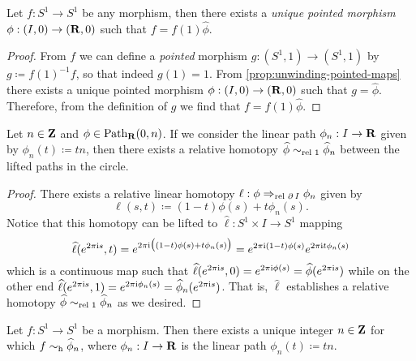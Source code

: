 \begin{theorem}
\label{thm:unwinding-maps}
Let \(f: S^1 \to S^1\) be any morphism, then there exists a \emph{unique pointed
  morphism} \(\phi: (I, 0) \to (\mathbf{R}, 0)\) such that \(f = f(1) \widehat \phi\).
\end{theorem}

\begin{proof}
From \(f\) we can define a \emph{pointed} morphism \(g: (S^1, 1) \to (S^1, 1)\)
by \(g \coloneq f(1)^{-1} f\), so that indeed \(g(1) = 1\). From
\cref{prop:unwinding-pointed-maps} there exists a unique pointed morphism
\(\phi: (I, 0) \to (\mathbf{R}, 0)\) such that \(g = \widehat \phi\). Therefore, from
the definition of \(g\) we find that \(f = f(1) \widehat \phi\).
\end{proof}

\begin{lemma}
\label{lem:path-to-int-is-htpy-turns-on-circle}
Let \(n \in \mathbf{Z}\) and \(\phi \in \operatorname{Path}_{\mathbf{R}}(0, n)\). If we consider the linear
path \(\phi_n: I \to \mathbf{R}\) given by \(\phi_n(t) \coloneq t n\), then there
exists a relative homotopy \(\widehat \phi \sim_{\text{rel }{1}} \widehat \phi_n\)
between the lifted paths in the circle.
\end{lemma}

\begin{proof}
There exists a relative linear homotopy \(\ell: \phi \Rightarrow_{\text{rel }{\operatorname{\partial}I}} \phi_n\)
given by
\[
\ell(s, t) \coloneq (1 - t) \phi(s) + t \phi_n(s).
\]
Notice that this homotopy can be lifted to
\(\widehat \ell: S^1 \times I \to S^1\) mapping
\[
\widehat\ell(e^{2 \pi \text{i} s}, t)
= e^{2 \pi \text{i} \big( (1-t)\phi(s) + t \phi_n(s) \big)}
= e^{2 \pi \text{i} (1-t)\phi(s)} e^{2 \pi \text{i} t \phi_n(s)}
\]
which is a continuous map such that
\(\widehat \ell(e^{2 \pi \text{i} s}, 0) = e^{2 \pi \text{i} \phi(s)} = \widehat
\phi(e^{2 \pi \text{i} s})\) while on the other end
\(\widehat \ell(e^{2 \pi \text{i} s}, 1) = e^{2 \pi \text{i} \phi_n(s)} = \widehat
\phi_n(e^{2 \pi \text{i} s})\). That is, \(\widehat \ell\) establishes a relative
homotopy \(\widehat \phi \sim_{\text{rel }{1}} \widehat \phi_n\) as we desired.
\end{proof}

\begin{proposition}
\label{prop:circle-morphism-is-winding}
Let \(f: S^1 \to S^1\) be a morphism. Then there exists a unique integer
\(n \in \mathbf{Z}\) for which \(f \sim_{\text{h}} \widehat \phi_n\), where \(\phi_n: I \to \mathbf{R}\)
is the linear path \(\phi_n(t) \coloneq t n\).
\end{proposition}

